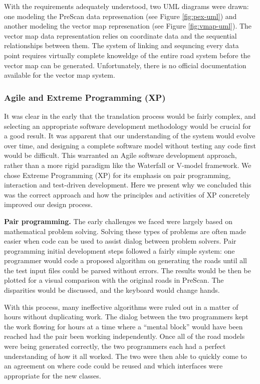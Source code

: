 \documentclass[12pt,twoside]{article}
\begin{document}
With the requirements adequately understood, two UML diagrams were drawn: one modeling the PreScan data represenation (see Figure \ref{fig:pex-uml}) and another modeling the vector map represenation (see Figure \ref{fig:vmap-uml}). The vector map data representation relies on coordinate data and the sequential relationships between them. The system of linking and sequncing every data point requires virtually complete knoweldge of the entire road system before the vector map can be generated. Unfortunately, there is no official documentation available for the vector map system.

\subsubsection{Agile and Extreme Programming (XP)}

It was clear in the early that the translation process would be fairly complex, and selecting an appropriate software development methodology would be crucial for a good result. It was apparent that our understanding of the system would evolve over time, and designing a complete software model without testing any code first would be difficult. This warranted an Agile software development approach, rather than a more rigid paradigm like the Waterfall or V-model framework. We chose Extreme Programming (XP) for its emphasis on pair programming, interaction and test-driven development. Here we present why we concluded this was the correct approach and how the principles and activities of XP concretely improved our design process.

\textbf{Pair programming.}
The early challenges we faced were largely based on mathematical problem solving. Solving these types of problems are often made easier when code can be used to assist dialog between problem solvers. Pair programming initial development steps followed a fairly simple system: one programmer would code a proposed algorithm on generating the roads until all the test input files could be parsed without errors. The results would be then be plotted for a visual comparison with the original roads in PreScan. The disparities would be discussed, and the keyboard would change hands.

With this process, many ineffective algorithms were ruled out in a matter of hours without duplicating work. The dialog between the two programmers kept the work flowing for hours at a time where a ``mental block'' would have been reached had the pair been working independently. Once all of the road models were being generated correctly, the two programmers each had a perfect understanding of how it all worked. The two were then able to quickly come to an agreement on where code could be reused and which interfaces were appropriate for the new classes.
\end{document}
